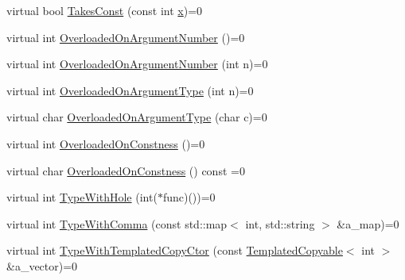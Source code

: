 \begin{DoxyCompactItemize}
\item 
virtual bool \mbox{\hyperlink{classtesting_1_1gmock__generated__function__mockers__test_1_1_foo_interface_a8c53e87edf0b9da878e5259f02b7f5dc}{Takes\+Const}} (const int \mbox{\hyperlink{_obj__test_2lib_2googletest-master_2googlemock_2test_2gmock-matchers__test_8cc_a6150e0515f7202e2fb518f7206ed97dc}{x}})=0
\item 
virtual int \mbox{\hyperlink{classtesting_1_1gmock__generated__function__mockers__test_1_1_foo_interface_ae9e86ac64fa9acedfb1fa747174c7f43}{Overloaded\+On\+Argument\+Number}} ()=0
\item 
virtual int \mbox{\hyperlink{classtesting_1_1gmock__generated__function__mockers__test_1_1_foo_interface_a1b5ff8cc745af475e0abba5d2858e1c9}{Overloaded\+On\+Argument\+Number}} (int n)=0
\item 
virtual int \mbox{\hyperlink{classtesting_1_1gmock__generated__function__mockers__test_1_1_foo_interface_ad9cc9a11570403fb8378ed6620892ec6}{Overloaded\+On\+Argument\+Type}} (int n)=0
\item 
virtual char \mbox{\hyperlink{classtesting_1_1gmock__generated__function__mockers__test_1_1_foo_interface_a8cb6caa44216ba29fc228b016523abe9}{Overloaded\+On\+Argument\+Type}} (char c)=0
\item 
virtual int \mbox{\hyperlink{classtesting_1_1gmock__generated__function__mockers__test_1_1_foo_interface_afbbe6ec72ae237de05e109dea5b03f4f}{Overloaded\+On\+Constness}} ()=0
\item 
virtual char \mbox{\hyperlink{classtesting_1_1gmock__generated__function__mockers__test_1_1_foo_interface_ab40007385078cdb675616a21ef254df4}{Overloaded\+On\+Constness}} () const =0
\item 
virtual int \mbox{\hyperlink{classtesting_1_1gmock__generated__function__mockers__test_1_1_foo_interface_a9e92ef227dc68806f85ebff9c8a6102a}{Type\+With\+Hole}} (int($\ast$func)())=0
\item 
virtual int \mbox{\hyperlink{classtesting_1_1gmock__generated__function__mockers__test_1_1_foo_interface_a64544adcb9c502a8fbc3990b53f4c767}{Type\+With\+Comma}} (const std\+::map$<$ int, std\+::string $>$ \&a\+\_\+map)=0
\item 
virtual int \mbox{\hyperlink{classtesting_1_1gmock__generated__function__mockers__test_1_1_foo_interface_ac3f47b680d4a46f2a77ebd76b7243187}{Type\+With\+Templated\+Copy\+Ctor}} (const \mbox{\hyperlink{classtesting_1_1gmock__generated__function__mockers__test_1_1_templated_copyable}{Templated\+Copyable}}$<$ int $>$ \&a\+\_\+vector)=0
\item 

\end{DoxyCompactItemize}
